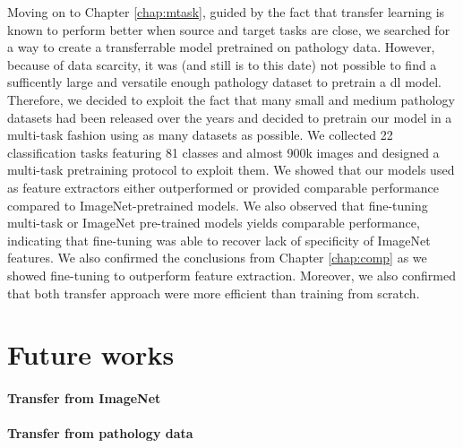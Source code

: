 Moving on to Chapter \ref{chap:mtask}, guided by the fact that transfer learning is known to perform better when source and target tasks are close, we searched for a way to create a transferrable model pretrained on pathology data. However, because of data scarcity, it was (and still is to this date) not possible to find a sufficently large and versatile enough pathology dataset to pretrain a \acrlong{dl} model. Therefore, we decided to exploit the fact that many small and medium pathology datasets had been released over the years and decided to pretrain our model in a multi-task fashion using as many datasets as possible. We collected 22 classification tasks featuring 81 classes and almost 900k images and designed a multi-task pretraining protocol to exploit them. We showed that our models used as feature extractors either outperformed or provided comparable performance compared to ImageNet-pretrained models. We also observed that fine-tuning multi-task or ImageNet pre-trained models yields comparable performance, indicating that fine-tuning was able to recover lack of specificity of ImageNet features. We also confirmed the conclusions from Chapter \ref{chap:comp} as we showed fine-tuning to outperform feature extraction. Moreover, we also confirmed that both transfer approach were more efficient than training from scratch.




\section{Future works}

\paragraph{Transfer from ImageNet} 


\paragraph{Transfer from pathology data}


